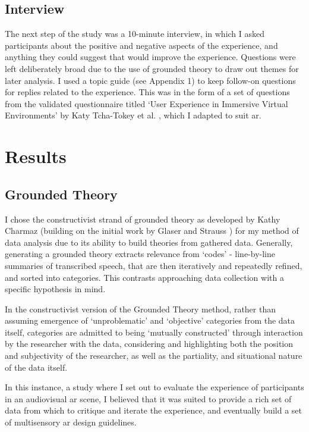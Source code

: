 \subsection{Interview}\label{sec: polaris-study-interview}
The next step of the study was a 10-minute interview, in which I asked participants about the positive and negative aspects of the experience, and anything they could suggest that would improve the experience. Questions were left deliberately broad due to the use of grounded theory to draw out themes for later analysis. I used a topic guide (see Appendix 1) to keep follow-on questions for replies related to the experience. This was in the form of a set of questions from the validated questionnaire titled `User Experience in Immersive Virtual Environments' by Katy Tcha-Tokey et al. \citeyearpar{tcha-tokey2016a}, which I adapted to suit \gls{ar}.

\section{Results}\label{sec: polaris-feedback}
\subsection{Grounded Theory}\label{sec: polaris-feedback-grounded}
I chose the constructivist strand of grounded theory as developed by Kathy Charmaz \citeyearpar{charmaz2006} (building on the initial work by Glaser and Strauss \citeyearpar{glaser1967}) for my method of data analysis due to its ability to build theories from gathered data. Generally, generating a grounded theory extracts relevance from `codes' - line-by-line summaries of transcribed speech, that are then iteratively and repeatedly refined, and sorted into categories. This contrasts approaching data collection with a specific hypothesis in mind.

In the constructivist version of the Grounded Theory method, rather than assuming emergence of `unproblematic' and `objective' categories from the data itself, categories are admitted to being `mutually constructed' through interaction by the researcher with the data, considering and highlighting both the position and subjectivity of the researcher, as well as the partiality, and situational nature of the data itself.

In this instance, a study where I set out to evaluate the experience of participants in an audiovisual \gls{ar} scene, I believed that it was suited to provide a rich set of data from which to critique and iterate the experience, and eventually build a set of multisensory \gls{ar} design guidelines.

